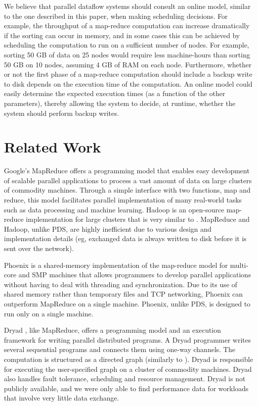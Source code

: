 \documentclass{acm_proc_article-sp}
\begin{document}
We believe that parallel dataflow systems should consult an online model,
similar to the one described in this paper, when making scheduling decisions.
For example, the throughput of a map-reduce computation can increase
dramatically if the sorting can occur in memory, and in some cases this can be
achieved by scheduling the computation to run on a sufficient number of
nodes. For example, sorting 50 GB of data on 25 nodes would require
less machine-hours than sorting 50 GB on 10 nodes, assuming 4 GB of
RAM on each node. Furthermore, whether or not the first phase of a map-reduce
computation should include a backup write to disk depends on the execution time
of the computation. An online model could easily determine the expected
execution times (as a function of the other parameters), thereby allowing the
system to decide, at runtime, whether the system should perform backup writes.

\section{Related Work}
Google's MapReduce \cite{mapreduce} offers a programming model that enables
easy development of scalable parallel applications to process a vast amount of
data on large clusters of commodity machines. Through a simple interface with
two functions, map and reduce, this model facilitates parallel implementation
of many real-world tasks such as data processing and machine learning. Hadoop
\cite{hadoop} is an open-source map-reduce implementation for large clusters
that is very similar to \cite{mapreduce}. MapReduce and Hadoop, unlike PDS, are
highly inefficient due to various design and implementation details (eg,
exchanged data is always written to disk before it is sent over the network).

Phoenix \cite{phoenix} is a shared-memory implementation of the map-reduce
model for multi-core and SMP machines that allows programmers to develop
parallel applications without having to deal with threading and
synchronization. Due to its use of shared memory rather than temporary files
and TCP networking, Phoenix can  outperform MapReduce on a single machine.
Phoenix, unlike PDS, is designed to run only on a single machine.

Dryad \cite{dryad}, like MapReduce, offers a programming model and an execution
framework for writing parallel distributed programs. A Dryad programmer writes
several sequential programs and connects them using one-way channels. The
computation is structured as a directed graph (similarly to
\cite{paralleldatabases}). Dryad is responsible for executing the
user-specified graph on a cluster of commodity machines. Dryad also handles
fault tolerance, scheduling and resource management. Dryad is not publicly
available, and we were only able to find performance data for workloads that
involve very little data exchange.
\end{document}
